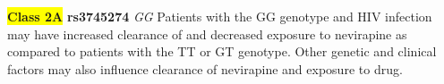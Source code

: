 \documentclass{book}
\begin{document}
\begin{center}


\textbf{\colorbox{yellow} {Class 2A}} \textbf{ rs3745274 } \textit{ GG }
Patients with the GG genotype and HIV infection may have increased clearance of and decreased exposure to nevirapine as compared to patients with the TT or GT genotype. Other genetic and clinical factors may also influence clearance of nevirapine and exposure to drug.


\end{center}
\end{document}
